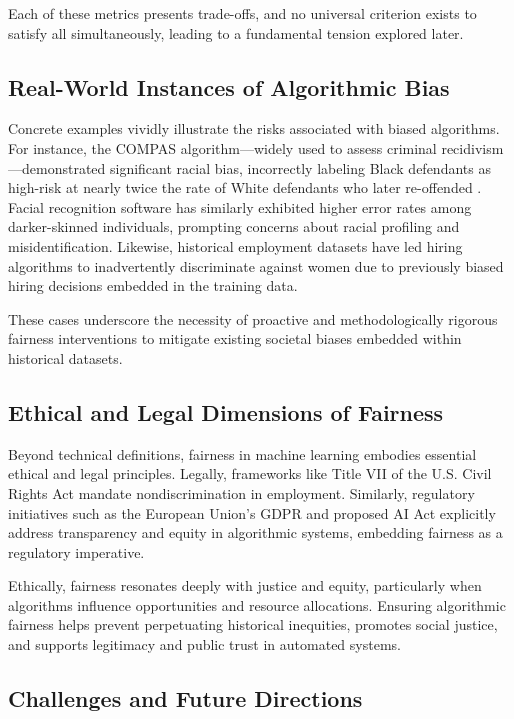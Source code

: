 Each of these metrics presents trade-offs, and no universal criterion exists to satisfy all simultaneously,
 leading to a fundamental tension explored later.

\subsection{Real-World Instances of Algorithmic Bias}\label{subsec:real_world_bias}

Concrete examples vividly illustrate the risks associated with biased algorithms. For instance, the COMPAS
algorithm—widely used to assess criminal recidivism—demonstrated significant racial bias, incorrectly labeling
Black defendants as high-risk at nearly twice the rate of White defendants who later re-offended \cite{angwin2016machine}.
Facial recognition software has similarly exhibited higher error rates among darker-skinned individuals, prompting concerns
about racial profiling and misidentification. Likewise, historical employment datasets have led hiring algorithms
to inadvertently discriminate against women due to previously biased hiring decisions embedded in the training data.

These cases underscore the necessity of proactive and methodologically rigorous fairness interventions to mitigate
 existing societal biases embedded within historical datasets.

\subsection{Ethical and Legal Dimensions of Fairness}\label{subsec:ethical_legal_dimensions}

Beyond technical definitions, fairness in machine learning embodies essential ethical and legal principles. Legally,
frameworks like Title VII of the U.S. Civil Rights Act mandate nondiscrimination in employment. Similarly, regulatory
initiatives such as the European Union’s GDPR and proposed AI Act explicitly address transparency and equity in
algorithmic systems, embedding fairness as a regulatory imperative.

Ethically, fairness resonates deeply with justice and equity, particularly when algorithms influence opportunities
and resource allocations. Ensuring algorithmic fairness helps prevent perpetuating historical inequities, promotes
social justice, and supports legitimacy and public trust in automated systems.

\subsection{Challenges and Future Directions}\label{subsec:challenges_future}


